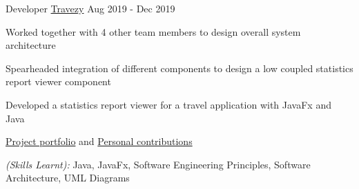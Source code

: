 \begin{cventries}

  \cventry
    {Developer} %
    {\href{https://github.com/bjhoohaha/main}{Travezy}} %
    {} %
    {Aug 2019 - Dec 2019} %
    {
      \begin{cvitems} %
        \item {Worked together with 4 other team members to design overall system architecture}
        \item {Spearheaded integration of different components to design a low coupled statistics report viewer component}
        \item {Developed a statistics report viewer for a travel application with JavaFx and Java}
        \item {\textcolor{eduDft-darkblue}{\href{https://ay1920s1-cs2103t-t17-2.github.io/main/index.html}{Project portfolio}} and  \textcolor{eduDft-darkblue}{\href{https://ay1920s1-cs2103t-t17-2.github.io/main/team/bjhoohaha.html}{Personal contributions}}}
        \item {\textit{(Skills Learnt):} Java, JavaFx, Software Engineering Principles, Software Architecture, UML Diagrams}
      \end{cvitems}
    }



\end{cventries}
